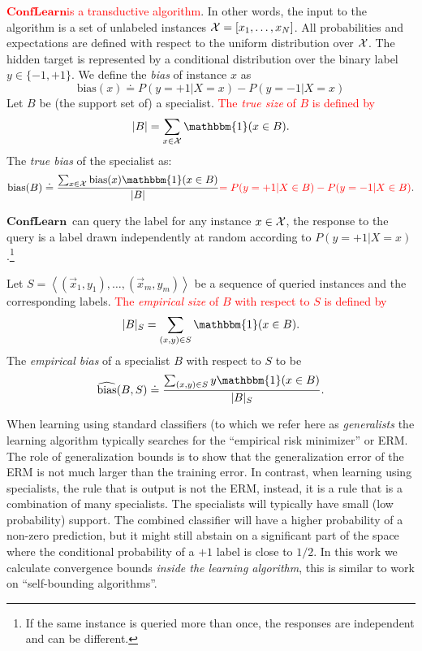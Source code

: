 \documentclass{article}
\newcommand{\x}{\vec{x}}
\newcommand{\ones}{\mathbbm{1}}
\newcommand{\bias}{\text{bias}}
\newcommand{\ebias}{\widehat{\text{bias}}}
\newcommand{\new}[1]{\textcolor{red}{#1}}
\newcommand{\ActiveLearn}{$\mathbf{ConfLearn}$}
\newcommand{\universe}[1]{{\cal #1}}
\newcommand{\samp}{S}
\newcommand{\comment}[3]{\marginpar{\textcolor{#2}{#1: #3}}}
\newcommand{\shay}[1]{\comment{Shay}{red}{#1}}
\newcommand{\yoav}[1]{\comment{Yoav}{blue}{#1}}
\begin{document}
\new{\ActiveLearn is a transductive algorithm}.
\shay{What does this mean? How is it different from
  standard algorithms in pool-based active learning?}
\yoav{The reason that transductive is easier is that the set of
  specialists is finite and we don't need to worry about intersections
  and unions of infinite sets when defining the boundary and the
  interior. The difference with pools of generalists comes from the
  fact that that specialists can concentrate on smaller parts of the
  input space.}
 In other words, the input to the algorithm is a set of unlabeled instances $\universe{X} =
[x_1,\ldots,x_N]$. All probabilities and expectations are defined with
respect to the uniform distribution over $\universe{X}$. The hidden
target is represented by a conditional distribution over the binary label
$y \in \{-1,+1\}$. We define the {\em bias} of instance $x$ as
\[
\bias(x) \doteq P(y=+1|X=x) - P(y=-1|X=x)
\]
Let $B$ be (the support set of) a specialist. 
\new{The {\em true size} of $B$ is defined by
\[\lvert B \rvert =  {\sum_{x \in \universe{X}} \ones(x \in B)}.\]}
The {\em true bias} of the specialist as:
\[
\bias(B) \doteq
\frac{\sum_{x \in \universe{X}} \bias(x) \ones(x \in B)}
{\lvert B \rvert}
\new{= P(y=+1 \vert X\in B) - P(y=-1 \vert X\in B)}.
\]

\ActiveLearn\ can query the label for any instance $x \in \universe{X}$, the
response to the query is a label drawn independently at random
according to $P(y=+1 | X=x)$.\footnote{If the same instance is queried
more than once, the responses are independent and can be different.}

Let $\samp= \left\langle (\x_1,y_1),\ldots,(\x_m,y_m) \right\rangle$ be a sequence
of queried instances and the corresponding labels. 
\new{The {\em empirical size} of $B$ with respect to $\samp$ is defined by
\[\lvert B \rvert_S =  {\sum_{(x,y) \in \samp} \ones(x \in B)}.\]}
\shay{The definition of $k(B)$ was missing. 
I added it and changed the notation from $k(B)$ to $\lvert B\rvert_S$.
If you agree then we should also change it in the simultaneous convergence proof.}
The {\em empirical bias} of a specialist $B$ with respect to $\samp$ to be 
\[
\ebias(B,\samp) \doteq
\frac{\sum_{(x,y) \in \samp} y \ones(x \in B)}{\lvert B\rvert_S}.
\]

\iffalse
When learning using standard classifiers (to which we refer here as
{\em generalists} the learning algorithm typically searches for the
``empirical risk minimizer'' or ERM. The role of generalization bounds
is to show that the generalization error of the ERM is not much larger
than the training error. In contrast, when learning using specialists,
the rule that is output is not the ERM, instead, it is a rule that is
a combination of many specialists. The specialists will typically have
small (low probability) support. The combined classifier will have a
higher probability of a non-zero prediction, but it might still
abstain on a significant part of the space where the conditional
probability of a $+1$ label is close to $1/2$. In this work 	
we calculate convergence bounds {\em inside the
  learning algorithm}, this is similar to work on ``self-bounding
algorithms''.
\end{document}
